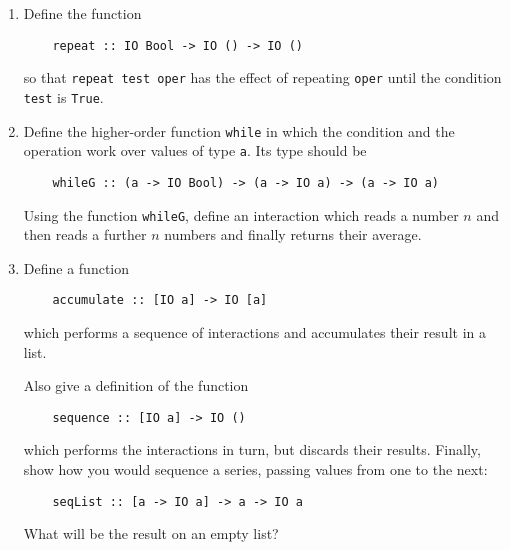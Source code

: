 \documentclass{article}
\def\code#1{\texttt{#1}}
\begin{document}
\begin{enumerate}
    \item \cite[p. 461]{thompson} Define the function
        \begin{verbatim}
    repeat :: IO Bool -> IO () -> IO ()
        \end{verbatim}
        so that \code{repeat test oper} has the effect of repeating \code{oper} until the condition \code{test} is \code{True}.

    \item \cite[p. 461]{thompson} Define the higher-order function \code{while} in which the condition and the operation work over values of type \code{a}. Its type should be
        \begin{verbatim}
    whileG :: (a -> IO Bool) -> (a -> IO a) -> (a -> IO a)
        \end{verbatim}
        Using the function \code{whileG}, define an interaction which reads a number $n$ and then reads a further $n$ numbers and finally returns their average.

    \item \cite[p. 461]{thompson} Define a function
        \begin{verbatim}
    accumulate :: [IO a] -> IO [a]
        \end{verbatim}
        which performs a sequence of interactions and accumulates their result in a list. \par
        Also give a definition of the function
        \begin{verbatim}
    sequence :: [IO a] -> IO ()
        \end{verbatim}
        which performs the interactions in turn, but discards their results. Finally, show how you would sequence a series, passing values from one to the next:
        \begin{verbatim}
    seqList :: [a -> IO a] -> a -> IO a
        \end{verbatim}
        What will be the result on an empty list?


\end{enumerate}
\end{document}
